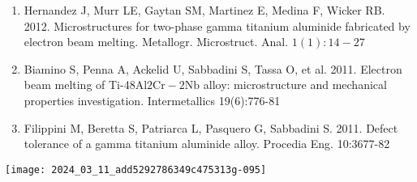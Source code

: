 \documentclass[10pt]{article}
\begin{document}
\begin{enumerate}
  \item Hernandez J, Murr LE, Gaytan SM, Martinez E, Medina F, Wicker RB. 2012. Microstructures for two-phase gamma titanium aluminide fabricated by electron beam melting. Metallogr. Microstruct. Anal. $1(1): 14-27$

  \item Biamino S, Penna A, Ackelid U, Sabbadini S, Tassa O, et al. 2011. Electron beam melting of Ti-48Al$2 \mathrm{Cr}-2 \mathrm{Nb}$ alloy: microstructure and mechanical properties investigation. Intermetallics 19(6):776-81

  \item Filippini M, Beretta S, Patriarca L, Pasquero G, Sabbadini S. 2011. Defect tolerance of a gamma titanium aluminide alloy. Procedia Eng. 10:3677-82

\end{enumerate}

\begin{center}
\texttt{[image: 2024\_03\_11\_add5292786349c475313g-095]}
\end{center}
\end{document}

